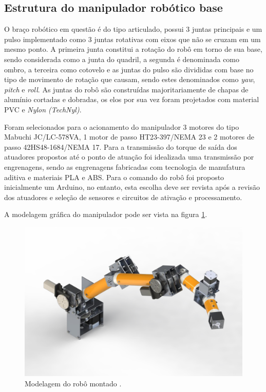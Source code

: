 \subsection{Estrutura do manipulador robótico base}
\label{sec:EstruturaBase}

O braço robótico em questão é do tipo articulado, possui 3 juntas principais e um pulso implementado como 3 juntas rotativas com eixos que não se cruzam em um
mesmo ponto. A primeira junta constitui a rotação do robô em torno de sua base, sendo considerada como a junta do quadril, a segunda é denominada como ombro, a terceira como cotovelo e as juntas do 
pulso são divididas com base no tipo de movimento de rotação que causam, sendo estes denominados como \textit{yaw}, \textit{pitch} e \textit{roll}. As juntas do robô são 
construídas majoritariamente de chapas de alumínio cortadas e dobradas, os elos por sua vez foram projetados com material PVC e \textit{Nylon (TechNyl)}. 

Foram selecionados para o acionamento do manipulador 3 motores do tipo Mabuchi JC/LC-578VA, 1 motor de passo HT23-397/NEMA 23 e 2 motores de passo 
42HS48-1684/NEMA 17. Para a transmissão do torque de saída dos atuadores propostos até o ponto de atuação foi idealizada uma transmissão por engrenagens,
sendo as engrenagens fabricadas com tecnologia de manufatura aditiva e materiais PLA e ABS. Para o comando do robô foi proposto inicialmente um Arduino, 
no entanto, esta escolha deve ser revista após a revisão dos atuadores e seleção de sensores e circuitos de ativação e processamento. 

A modelagem gráfica do manipulador pode ser vista na figura \ref{fig:manipulador-base}.

\begin{figure}[h]
\caption{Modelagem do robô montado \cite{fernando2019assistivo}.}    
\begin{centering}
\includegraphics[width=0.8\columnwidth]{images/intro/manipulador-base.png}
\par\end{centering}

\label{fig:manipulador-base}
\end{figure}

